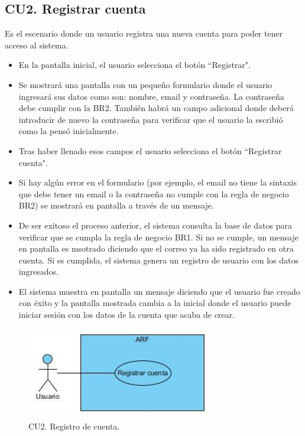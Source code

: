 \subsection{CU2. Registrar cuenta} \par
Es el escenario donde un usuario registra una nueva cuenta para poder tener acceso al sistema.
\begin{itemize}
	\item En la pantalla inicial, el usuario selecciona el botón ``Registrar".
	\item Se mostrará una pantalla con un pequeño formulario donde el usuario ingresará sus datos como son: nombre, email y contraseña. La contraseña debe cumplir con la BR2. También habrá un campo adicional donde deberá introducir de nuevo la contraseña para verificar que el usuario la escribió como la pensó inicialmente.
	\item Tras haber llenado esos campos el usuario selecciona el botón ``Registrar cuenta".
	\item Si hay algún error en el formulario (por ejemplo, el email no tiene la sintaxis que debe tener un email o la contraseña no cumple con la regla de negocio BR2) se mostrará en pantalla a través de un mensaje.
	\item De ser exitoso el proceso anterior, el sistema consulta la base de datos para verificar que se cumpla la regla de negocio BR1. Si no se cumple, un mensaje en pantalla es msotrado diciendo que el correo ya ha sido registrado en otra cuenta. Si es cumplida, el sistema genera un registro de usuario con los datos ingresados.
	\item El sistema muestra en pantalla un mensaje diciendo que el usuario fue creado con éxito y la pantalla mostrada cambia a la inicial donde el usuario puede iniciar sesión con los datos de la cuenta que acaba de crear.
\end{itemize}

\begin{figure}[h!]
	\centering
	\includegraphics[width=8cm,height=4cm]{imagenes/analisis/cu/registrar_cuenta.jpg}
	\caption{CU2. Registro de cuenta.}
	\label{fig:registrarcuenta}
\end{figure} 

